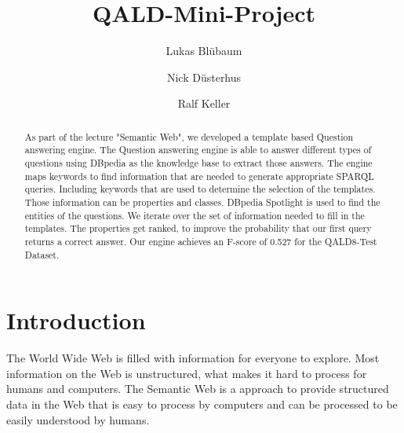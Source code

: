 \documentclass[runningheads]{llncs}
\begin{document}
%
\title{QALD-Mini-Project}
%
\newcommand\tab[1][1cm]{\hspace*{#1}}
\author{Lukas Bl{\"u}baum \and
Nick D{\"u}sterhus \and
Ralf Keller}
%
%



%
\maketitle              %
%
\begin{abstract}
As part of the lecture "Semantic Web", we developed a template based Question answering engine. The Question answering engine is able to answer different types of questions using DBpedia as the knowledge base to extract those answers.
The engine maps keywords to find information that are needed to generate appropriate SPARQL queries. Including keywords that are used to determine the selection of the templates.
Those information can be properties and classes. DBpedia Spotlight is used to find the entities of the questions.
We iterate over the set of information needed to fill in the templates.
The properties get ranked, to improve the probability that our first query returns a correct answer.
Our engine achieves an F-score of 0.527 for the QALD8-Test Dataset.

\end{abstract}
%
%
%
\section{Introduction}  

The World Wide Web is filled with information for everyone to explore. Most information on the Web is unstructured, what makes it hard to process for humans and computers. The Semantic Web is a approach to provide structured data in the Web that is easy to process by computers and can be processed to be easily understood by humans. \\
\end{document}
